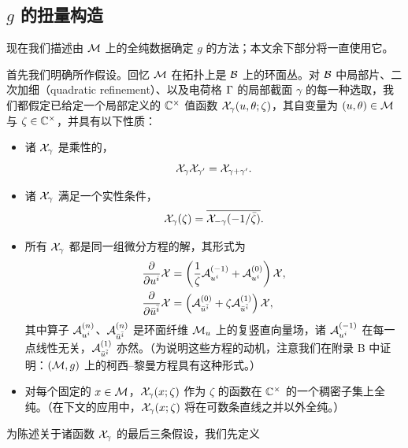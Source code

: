 \subsection{$g$ 的扭量构造}
\label{sec:twistor-general}

现在我们描述由 $\mathcal{M}$ 上的全纯数据确定 $g$ 的方法；本文余下部分将一直使用它。

首先我们明确所作假设。回忆 $\mathcal{M}$ 在拓扑上是 $\mathcal{B}$ 上的环面丛。对 $\mathcal{B}$ 中局部片、二次加细（quadratic refinement）、以及电荷格 $\Gamma$ 的局部截面 $\gamma$ 的每一种选取，我们都假定已给定一个局部定义的 $\mathbb{C}^\times$ 值函数 $\mathcal{X}_\gamma(u,\theta;\zeta)$，其自变量为 $(u,\theta) \in \mathcal{M}$ 与 $\zeta \in \mathbb{C}^\times$，并具有以下性质：
\begin{itemize}

\item 诸 $\mathcal{X}_\gamma$ 是乘性的，
\begin{equation}
\mathcal{X}_\gamma \mathcal{X}_{\gamma'} = \mathcal{X}_{\gamma + \gamma'}.
\end{equation}

\item 诸 $\mathcal{X}_\gamma$ 满足一个实性条件，
\begin{equation} \label{eq:X-real}
\mathcal{X}_\gamma(\zeta) = \overline{\mathcal{X}_{-\gamma}(-1 / \bar\zeta)}.
\end{equation}

\item 所有 $\mathcal{X}_\gamma$ 都是同一组微分方程的解，其形式为
\begin{align}
\frac{\partial}{\partial u^i} \mathcal{X} &= \left( \frac{1}{\zeta} \mathcal{A}^{(-1)}_{u^i} + \mathcal{A}^{(0)}_{u^i} \right)  \mathcal{X} , \label{eq:cr-1} \\
\frac{\partial}{\partial \bar{u}^{\bar i}} \mathcal{X} &= \left( \mathcal{A}^{(0)}_{\bar{u}^{\bar{i}}} + \zeta \mathcal{A}^{(1)}_{\bar{u}^{\bar{i}}} \right) \mathcal{X}, \label{eq:cr-2}
\end{align}
其中算子 $\mathcal{A}^{(n)}_{u^i}$、$\mathcal{A}^{(n)}_{\bar{u}^{\bar{i}}}$ 是环面纤维 $\mathcal{M}_u$ 上的复竖直向量场，诸 $\mathcal{A}^{(-1)}_{u^i}$ 在每一点线性无关，$\mathcal{A}^{(1)}_{\bar{u}^{\bar{i}}}$ 亦然。（为说明这些方程的动机，注意我们在附录 B 中证明：$(\mathcal{M}, g)$ 上的柯西--黎曼方程具有这种形式。）%

\item 对每个固定的 $x \in \mathcal{M}$，$\mathcal{X}_\gamma(x; \zeta)$ 作为 $\zeta$ 的函数在 $\mathbb{C}^\times$ 的一个稠密子集上全纯。（在下文的应用中，$\mathcal{X}_\gamma(x; \zeta)$ 将在可数条直线之并以外全纯。）

\end{itemize}
为陈述关于诸函数 $\mathcal{X}_\gamma$ 的最后三条假设，我们先定义
